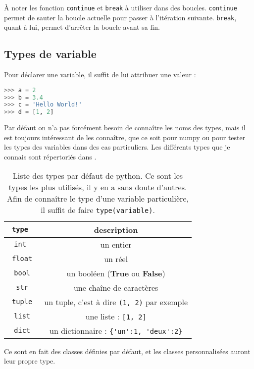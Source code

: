 \documentclass[a4paper,twoside]{article}
\begin{document}
\begin{remarque}
À noter les fonction \texttt{continue} et \texttt{break} à utiliser dans des boucles. \texttt{continue} permet de sauter la boucle actuelle pour passer à l'itération suivante. \texttt{break}, quant à lui, permet d'arrêter la boucle avant sa fin.
\end{remarque}



\subsection{Types de variable}
Pour déclarer une variable, il suffit de lui attribuer une valeur :
\begin{lstlisting}[language=python]
>>> a = 2
>>> b = 3.4
>>> c = 'Hello World!'
>>> d = [1, 2]
\end{lstlisting}


Par défaut on n'a pas forcément besoin de connaître les noms des types, mais il est toujours intéressant de les connaître, que ce soit pour numpy ou pour tester les types des variables dans des cas particuliers. Les différents types que je connais sont répertoriés dans .

\begin{table}[htb]
\centering
\begin{tabular}{|>{\tt}c<{}|c|}
\hline
type & description\\\hline
int & un entier\\\hline
float & un réel\\\hline
bool & un booléen (\textbf{True} ou \textbf{False})\\\hline
str & une chaîne de caractères\\\hline
tuple & un tuple, c'est à dire \verb|(1, 2)| par exemple\\\hline
list & une liste : \verb|[1, 2]|\\\hline
dict & un dictionnaire : \verb|{'un':1, 'deux':2}|\\\hline
\end{tabular}

\caption{Liste des types par défaut de python. Ce sont les types les plus utilisés, il y en a sans doute d'autres. Afin de connaître le type d'une variable particulière, il suffit de faire \texttt{type(variable)}.}\label{tab:types}
\end{table}

Ce sont en fait des classes définies par défaut, et les classes personnalisées auront leur propre type. 
\end{document}
